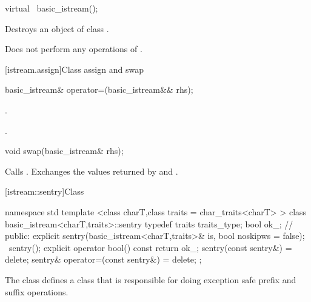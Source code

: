 %
\begin{itemdecl}
virtual ~basic_istream();
\end{itemdecl}

\begin{itemdescr}
\pnum
\effects
Destroys an object of class
.

\pnum
\notes
Does not perform any operations of
.
\end{itemdescr}

[istream.assign]{Class  assign and swap}

%
%
\begin{itemdecl}
basic_istream& operator=(basic_istream&& rhs);
\end{itemdecl}

\begin{itemdescr}
\pnum
\effects {}.

\pnum
\returns {}.
\end{itemdescr}

%
%
\begin{itemdecl}
void swap(basic_istream& rhs);
\end{itemdecl}

\begin{itemdescr}
\pnum
\effects Calls .
Exchanges the values returned by  and
.
\end{itemdescr}

[istream::sentry]{Class }

%
\begin{codeblock}
namespace std {
  template <class charT,class traits = char_traits<charT> >
  class basic_istream<charT,traits>::sentry {
    typedef traits traits_type;
    bool ok_; // \exposr
  public:
    explicit sentry(basic_istream<charT,traits>& is, bool noskipws = false);
    ~sentry();
    explicit operator bool() const { return ok_; }
    sentry(const sentry&) = delete;
    sentry& operator=(const sentry&) = delete;
  };
}
\end{codeblock}

\begin{itemdescr}
\pnum
The class
defines a class that is responsible for doing exception safe prefix and suffix
operations.
\end{itemdescr}

